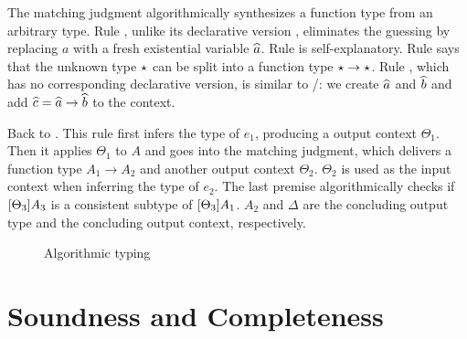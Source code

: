 The matching judgment algorithmically synthesizes a function type from an
arbitrary type. Rule , unlike its declarative version
, eliminates the guessing by replacing
$a$ with a fresh existential variable $\widehat{a}$. Rule  is
self-explanatory. Rule  says that the unknown type $\star$
can be split into a function type $\star \to \star$. Rule ,
which has no corresponding declarative version, is similar to
/: we create $\widehat{a}$ and $\widehat{b}$ and add $\widehat{c} =
\widehat{a} \to \widehat{b}$ to the context.

Back to . This rule first infers the type of $e_1$, producing a output
context $\Theta_1$. Then it applies $\Theta_1$ to $A$ and goes into the matching
judgment, which delivers a function type $A_1 \to A_2$ and another output
context $\Theta_2$. $\Theta_2$ is used as the input context when inferring the
type of $e_2$. The last premise algorithmically checks if
$[\Theta_3]A_3$ is a consistent subtype of
$[\Theta_3]A_1$. $A_2$ and $\Delta$ are the concluding output type
and the concluding output context, respectively.


\begin{figure}[t]
  \centering
  \begin{small}

  \end{small}
  \caption{Algorithmic typing}
  \label{fig:algo:typing}
\end{figure}


\section{Soundness and Completeness}
\label{sec:sound:complete}

